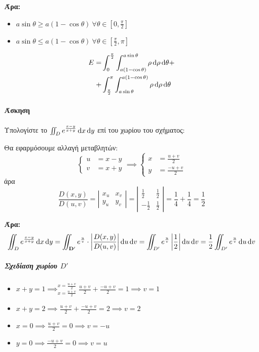 \documentclass[11pt,a4paper,titlepage]{article}
\begin{document}
\textbf{Άρα:}
\begin{itemize}
\item \(a\sin\theta \geq a(1-\cos\theta)\ \forall \theta \in [0,\frac{\pi}{2}]\)
\item \(a\sin\theta\leq a(1-\cos\theta)\ \forall \theta \in [\frac{\pi}{2},\pi]\)
\end{itemize}

\begin{align*}
E=&\int_0^\frac{\pi}{2}\int^{a\sin\theta}_{a(1-\cos\theta)}\rho\dif\rho\dif\theta +
\\
+&\int_\frac{\pi}{2}^\pi\int_{a\sin\theta}^{a(1-\cos\theta)}\rho\dif\rho\dif\theta
\end{align*}


\paragraph{Άσκηση}
Υπολογίστε το \(\iint_D e^{\frac{x-y}{x+y}} \dif x \dif y\) επί του χωρίου του σχήματος:

Θα εφαρμόσουμε αλλαγή μεταβλητών:
\[
\begin{cases}
u&=x-y\\v&=x+y
\end{cases}
\implies
\begin{cases}
x&=\frac{u+v}{2}\\
y&=\frac{-u+v}{2}
\end{cases}
\]
άρα
\[
\frac{D(x,y)}{D(u,v)} = \left|
\begin{matrix}
x_u&x_v\\y_u&y_v
\end{matrix}
\right|=\left|
\begin{matrix}
\frac{1}{2}&\frac{1}{2}\\-\frac{1}{2}&\frac{1}{2}
\end{matrix}
\right|=\frac{1}{4}+\frac{1}{4}=\frac{1}{2}
\]

\textbf{Άρα:}
\[
\iint_D e^{\frac{x-y}{x+y}}\dif x \dif y = \iint_\mathbf{D'}e^\frac{u}{v} \cdot \left|
\frac{D(x,y)}{D(u,v)}\right|\dif u \dif v = \iint_{D'} e^\frac{u}{v}\left|\frac{1}{2}\right| \dif u \dif v
= \frac{1}{2} \iint_{D'} e^\frac{u}{v} \dif u \dif v
\]

\subparagraph{Σχεδίαση χωρίου $D'$}
\begin{itemize}
\item \(x+y=1 \implies^{x=\frac{u+v}{2}}_{x=\frac{u+v}{2}} \frac{u+v}{2}+ \frac{-u+v}{2} = 1 \implies \boxed{v=1}\)\\
\item \(x+y=2 \implies \frac{u+v}{2}+ \frac{-u+v}{2} = 2 \implies \boxed{v=2}\)\\
\item \(x=0 \implies \frac{u+v}{2} = 0 \implies \boxed{v=-u}\)
\item \(y=0 \implies \frac{-u+v}{2} = 0 \implies \boxed{v=u}\)
\end{itemize}
\end{document}
